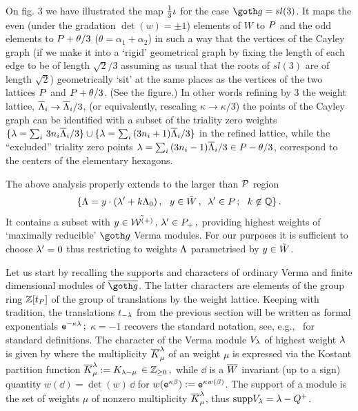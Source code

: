 \medskip
On fig. 3 we have illustrated the map ${1\over 3}\iota$ for the
case $\go=sl(3)$. It maps the even (under the gradation
$\det(w)=\pm 1$) elements of $W$ to $P$ and the odd elements to
$P+\theta/3$ ($\theta= \alpha_1+\alpha_2$) in such a way that
the vertices of the Cayley graph (if we make it into a `rigid'
geometrical graph by fixing the length of each edge to be of
length $\sqrt{2}/3$ assuming as usual that the roots of $sl(3)$
are of length $\sqrt{2}$) geometrically `sit' at the same places
as the vertices of the two lattices $P$ and $P+\theta/3$.
(See the figure.) In other words refining by $3$ the weight
lattice, $\overline{\Lambda}_i \rightarrow \overline{\Lambda}_i/3$, (or equivalently,
rescaling $\kappa \rightarrow \kappa/3$) the points of the Cayley
graph can be identified with a subset of the triality zero
weights $\{\lambda=\sum_i\, 3 n_i \overline{\Lambda}_i/3\}\cup \{\lambda=\sum_i\, (3
n_i+1) \overline{\Lambda}_i/3 \}$ in the refined lattice, while the ``excluded''
triality zero points $\lambda=\sum_i\, (3 n_i-1) \overline{\Lambda}_i/3\in
P-\theta/3$, correspond to the centers of the elementary
hexagons.


\noindent
\REMARK
The above analysis properly extends to the larger than ${\cal P}$
region 
$$
\{\zL= y\cdot(\zl'+ k \zL_0)\,, \ \,\, y\in \tW\,,\  \, \zl'
\in P \,; \ \ 
k \not \in \IQ \}\,.
$$
 It contains a subset with $y\in \tilde{{\cal W}^{(+)}}\,, \, \lambda'\in P_+\,,$
providing highest weights of `maximally reducible' $\go$ Verma
modules.  For our purposes it is sufficient to choose $\lambda'=0$
thus restricting to weights $\Lambda$ parametrised by $y \in\tilde W$. 
%
%


Let us start by recalling the  supports and characters  of
ordinary Verma and finite dimensional modules of $\bgo$.
The latter characters are elements of the group ring
$\Bbb Z[t_P]$ of the group of translations by the weight
lattice.  Keeping with tradition, the translations $t_{-\lambda}$
from the previous section will be written as formal exponentials
$\ts-,\zl\,;$ $\kappa =-1 $ recovers the standard notation, see,
e.g., \Bour\ for standard definitions.
The character of the Verma module $V_{\lambda}$ of highest weight
$\lambda$ is given by 
%
\eqn{}
%
where the multiplicity $\overline{ K}_{\mu}^{\lambda}$  of an weight $\mu$ is
expressed via the Kostant partition function
$\overline{ K}_{\mu}^{\lambda}:=K_{\lambda-\mu}\,\in\Bbb Z_{\ge 0}\,,$ while $\dd$ is a
$\overline W$ invariant (up to a sign) quantity $w(\dd)=\det(w)\, \dd$
for $w(\ts,{\zb}):=\ts,{w(\zb)}$.  The support of a module is the
set of weights $\mu$ of nonzero multiplicity $\overline{ K}_{\mu}^{\lambda}$,
thus ${\rm supp}V_{\lambda}= \lambda-Q^+$.


